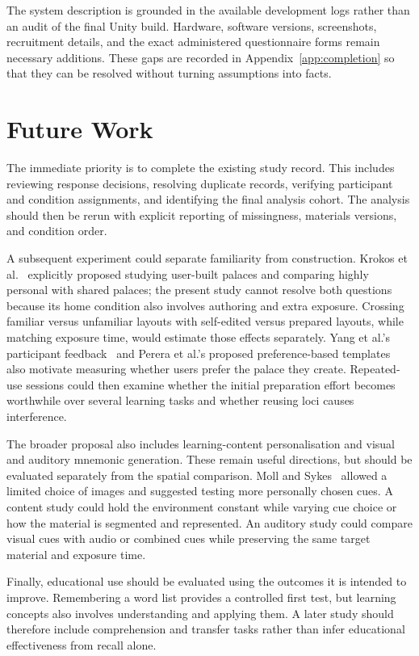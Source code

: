 The system description is grounded in the available development logs rather than an audit of the final Unity build. Hardware, software versions, screenshots, recruitment details, and the exact administered questionnaire forms remain necessary additions. These gaps are recorded in Appendix~\ref{app:completion} so that they can be resolved without turning assumptions into facts.

\section{Future Work}
The immediate priority is to complete the existing study record. This includes reviewing response decisions, resolving duplicate records, verifying participant and condition assignments, and identifying the final analysis cohort. The analysis should then be rerun with explicit reporting of missingness, materials versions, and condition order.

A subsequent experiment could separate familiarity from construction. Krokos et al.~\cite{krokos2019} explicitly proposed studying user-built palaces and comparing highly personal with shared palaces; the present study cannot resolve both questions because its home condition also involves authoring and extra exposure. Crossing familiar versus unfamiliar layouts with self-edited versus prepared layouts, while matching exposure time, would estimate those effects separately. Yang et al.'s participant feedback~\cite{yang2021} and Perera et al.'s proposed preference-based templates~\cite{perera2019} also motivate measuring whether users prefer the palace they create. Repeated-use sessions could then examine whether the initial preparation effort becomes worthwhile over several learning tasks and whether reusing loci causes interference.

The broader proposal also includes learning-content personalisation and visual and auditory mnemonic generation. These remain useful directions, but should be evaluated separately from the spatial comparison. Moll and Sykes~\cite{moll2023} allowed a limited choice of images and suggested testing more personally chosen cues. A content study could hold the environment constant while varying cue choice or how the material is segmented and represented. An auditory study could compare visual cues with audio or combined cues while preserving the same target material and exposure time.

Finally, educational use should be evaluated using the outcomes it is intended to improve. Remembering a word list provides a controlled first test, but learning concepts also involves understanding and applying them. A later study should therefore include comprehension and transfer tasks rather than infer educational effectiveness from recall alone.


